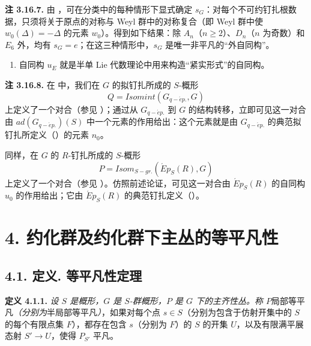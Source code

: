 \textbf{注 3.16.7.}  由 ，可在分类中的每种情形下显式确定 \(s_{G}\)：对每个不可约钉扎根数据，只须将关于原点的对称与 Weyl 群中的对称复合（即 Weyl 群中使 \(w_{0}(\Delta) = -\Delta\) 的元素 \(w_{0}\)）。得到如下结果：除 \(A_{n}\)（\(n \geqslant 2\)）、\(D_{n}\)（\(n\) 为奇数）和 \(E_6\) 外，均有 \(s_{G} = e\)；在这三种情形中，\(s_{G}\) 是唯一非平凡的“外自同构”。
\begin{enumerate}
\def\labelenumi{(\roman{enumi})}
\setcounter{enumi}{1}
\item 自同构 \(u_{E}\) 就是半单 Lie 代数理论中用来构造“紧实形式”的自同构。
\end{enumerate}

\textbf{注 3.16.8.} 在  中，我们在 \(G\) 的拟钉扎所成的 \(S\)-概形
\[
Q = Isomint(G_{q-\acute{e}p.}, G)
\]
上定义了一个对合（参见 ）；通过从 \(G_{q-\acute{e}p.}\) 到 \(G\) 的结构转移，立即可见这一对合由 \(ad(G_{q-\acute{e}p.})(S)\) 中一个元素的作用给出：这个元素就是由 \(G_{q-\acute{e}p.}\) 的典范拟钉扎所定义（）的元素 \(n_{0}\)。

同样，在 \(G\) 的 \(R\)-钉扎所成的 \(S\)-概形
\[ P = Isom_{S-gr.}(\acute{E}p_{S}(R), G) \]
上定义了一个对合（参见 ）。仿照前述论证，可见这一对合由 \(\acute{E}p_{S}(R)\) 的自同构 \(u_{0}\) 的作用给出；它由 \(\acute{E}p_{S}(R)\) 的典范钉扎定义（）。

\section*{4. 约化群及约化群下主丛的等平凡性}
\subsection*{4.1. 定义. 等平凡性定理}

\textbf{定义 4.1.1.} \emph{设 \(S\) 是概形，\(G\) 是 \(S\)-群概形，\(P\) 是 \(G\) 下的主齐性丛。称 \(P\)}局部等平凡\emph{（分别为}半局部等平凡\emph{）}，如果对每个点 \(s \in S\)（分别为包含于仿射开集中的 \(S\) 的每个有限点集 \(F\)），都存在包含 \(s\)（分别为 \(F\)）的 \(S\) 的开集 \(U\)，以及有限满平展态射 \(S' \to U\)，使得 \(P_{S'}\) 平凡。

